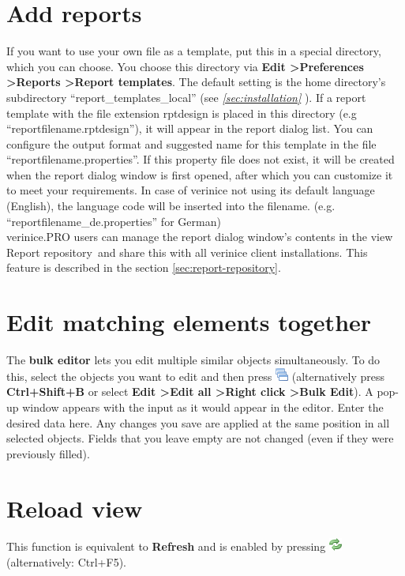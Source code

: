 \documentclass[a4paper,10pt]{book}
\begin{document}
\section{Add reports}
\label{sec:add-reports}

If you want to use your own file as a
template, put this in a special directory, which you can choose. You choose this directory via
\textbf{Edit \textgreater Preferences \textgreater Reports
  \textgreater Report templates}. The default setting is the home
directory's subdirectory ``report\_templates\_local'' (see {\em
  \ref{sec:installation} }). If a report
template with the file extension rptdesign is placed in this
directory (e.g ``reportfilename.rptdesign''), it will appear in the report
dialog list. You can configure the output format and suggested name for this template in the file
``reportfilename.properties''. If this property file does not
exist, it will be created when the report dialog window is first opened, after which you can 
customize it to meet your requirements. In case of verinice not using its
default language (English), the language code will be inserted into the filename. 
(e.g. ``reportfilename\_de.properties'' for German)\\

verinice.PRO users can manage the report dialog window's contents in
the view \glqq Report repository\grqq\ and share this with all
verinice client installations. This feature is described in the
section \ref{sec:report-repository}.


\section{Edit matching elements together}
The \textbf{bulk editor} lets you edit multiple similar objects simultaneously.
To do this, select the objects you want to edit and then press \includegraphics[height=2ex]{Icon/Masseneditor.png}
(alternatively press \textbf{Ctrl+Shift+B} or select \textbf{Edit \textgreater Edit all \textgreater Right click \textgreater Bulk Edit}).
A pop-up window appears with the input as it would appear in the editor. Enter
the desired data here. Any changes you save are applied at the same position in all selected objects.
Fields that you leave empty are not changed (even if they were previously filled).

\section{Reload view}
This function is equivalent to \textbf{Refresh} and is enabled by pressing
\includegraphics[height=2ex]{Icon/Aktualisieren.png} (alternatively: Ctrl+F5).
\end{document}
